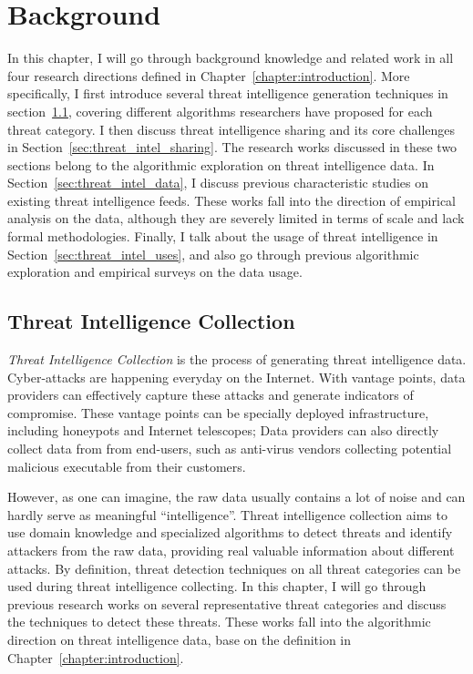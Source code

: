 \chapter{Background}
\label{chapter:background}

In this chapter, I will go through background knowledge and related work
in all four research directions defined in Chapter~\ref{chapter:introduction}.
More specifically, I first introduce several threat intelligence 
generation techniques in section~\ref{sec:threat_intel_generation}, covering 
different algorithms researchers have proposed for each threat category. I
then discuss threat intelligence sharing and its core challenges in 
Section~\ref{sec:threat_intel_sharing}. The research works discussed in these
two sections belong to the algorithmic exploration on threat intelligence data. 
In Section~\ref{sec:threat_intel_data}, I discuss previous characteristic studies
on existing threat intelligence feeds. These works fall into the direction of 
empirical analysis on the data, although they are severely limited in terms of 
scale and lack formal methodologies. Finally, I talk about the usage of threat 
intelligence in Section~\ref{sec:threat_intel_uses}, and also go through 
previous algorithmic exploration and empirical surveys on the data usage.

\section{Threat Intelligence Collection}
\label{sec:threat_intel_generation}

\textit{Threat Intelligence Collection} is the process of generating threat 
intelligence data. Cyber-attacks are happening everyday on the Internet.
With vantage points, data providers can effectively capture these attacks 
and generate indicators of compromise. These vantage points can be specially
deployed infrastructure, including honeypots and Internet telescopes; Data
providers can also directly collect data from from end-users, such as 
anti-virus vendors collecting potential malicious executable from their
customers. 

However, as one can imagine, the raw data usually contains a lot of noise 
and can hardly serve as meaningful ``intelligence''. Threat intelligence 
collection aims to use domain knowledge and specialized algorithms to detect 
threats and identify attackers from the raw data, providing real valuable 
information about different attacks. By definition, threat detection
techniques on all threat categories can be used during threat intelligence 
collecting. In this chapter, I will go through previous research works
on several representative threat categories and discuss the techniques to 
detect these threats. These works fall into the algorithmic direction on
threat intelligence data, base on the definition in 
Chapter~\ref{chapter:introduction}.

